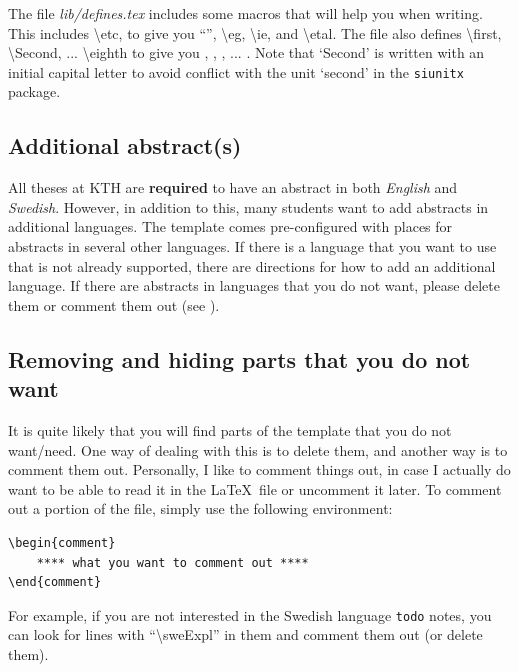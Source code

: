 \documentclass[main.tex]{subfiles}
\begin{document}
The file \textit{lib/defines.tex} includes some macros that will help you when writing. This includes \textbackslash etc, to give you ``\etc'', \textbackslash eg, \textbackslash ie, and \textbackslash etal.
The file also defines \textbackslash first, \textbackslash Second, ... \textbackslash eighth to give you \first, \Second, \third, ... \eighth. Note that `Second' is written with an initial capital letter to avoid conflict with the unit `second' in the \texttt{siunitx} package.

\subsection{Additional abstract(s)}
\label{sec:additionalAbstracts}

All theses at KTH are \textbf{required} to have an abstract in both \textit{English} and \textit{Swedish}. However, in addition to this, many students want to add abstracts in additional languages. The template comes pre-configured with places for abstracts in several other languages. If there is a language that you want to use that is not already supported, there are directions for how to add an additional language. If there are abstracts in languages that you do not want, please delete them or comment them out (see ).

\subsection{Removing and hiding parts that you do not want}
\label{sec:hideComment}

It is quite likely that you will find parts of the template that you do not want/need. One way of dealing with this is to delete them, and another way is to comment them out. Personally, I like to comment things out, in case I actually do want to be able to read it in the \LaTeX\  file or uncomment it later. To comment out a portion of the file, simply use the following environment:

\begin{lstlisting}[style=latexExampleForAuthors]
\begin{comment}
    **** what you want to comment out ****
\end{comment}
\end{lstlisting}

For example, if you are not interested in the Swedish language \texttt{todo} notes, you can look for lines with ``\textbackslash sweExpl'' in them and comment them out (or delete them).
\end{document}
